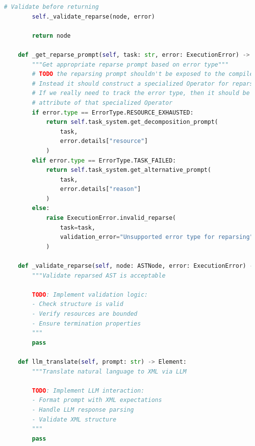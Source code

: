\documentclass{article}
\begin{document}
\begin{lstlisting}[language=Python]
        # Validate before returning
        self._validate_reparse(node, error)
        
        return node

    def _get_reparse_prompt(self, task: str, error: ExecutionError) -> str:
        """Get appropriate reparse prompt based on error type"""
        # TODO the reparsing prompt shouldn't be exposed to the compiler. 
        # Instead it should construct a specialized Operator for reparsing. 
        # If we really need to track the error type, then it should be an 
        # attribute of that specialized Operator
        if error.type == ErrorType.RESOURCE_EXHAUSTED:
            return self.task_system.get_decomposition_prompt(
                task,
                error.details["resource"]
            )
        elif error.type == ErrorType.TASK_FAILED:
            return self.task_system.get_alternative_prompt(
                task,
                error.details["reason"]
            )
        else:
            raise ExecutionError.invalid_reparse(
                task=task,
                validation_error="Unsupported error type for reparsing"
            )

    def _validate_reparse(self, node: ASTNode, error: ExecutionError) -> None:
        """Validate reparsed AST is acceptable
        
        TODO: Implement validation logic:
        - Check structure is valid
        - Verify resources are bounded
        - Ensure termination properties
        """
        pass

    def llm_translate(self, prompt: str) -> Element:
        """Translate natural language to XML via LLM
        
        TODO: Implement LLM interaction:
        - Format prompt with XML expectations
        - Handle LLM response parsing
        - Validate XML structure
        """
        pass

\end{lstlisting}
\end{document}
